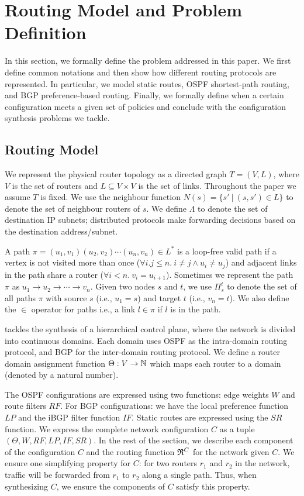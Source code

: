 \section{Routing Model and Problem Definition}
In this section, we formally define the problem addressed in this
paper.  We first define common notations and then show how different
routing protocols are represented.  In particular, we model static
routes, OSPF shortest-path routing, and BGP preference-based routing.
Finally, we formally define when a certain configuration meets a given
set of policies and conclude with the configuration synthesis problems
we tackle.

\subsection{Routing Model}

We represent the physical router topology as a directed graph $T=(V, L)$,
where $V$ is the set of routers and $L\subseteq V\times V$ is the set of links. 
Throughout the paper we assume $T$ is fixed.
We use the neighbour function $N(s) = \{s'\ | \ (s,s') \in L \}$ to denote 
the set of neighbour routers of $s$. 
We define $\Lambda$ to denote the set of destination IP subnets;
distributed protocols make forwarding decisions based on the 
destination address/subnet.

A path $\pi = (u_1,v_1) (u_2, v_2) \cdots (u_n, v_n) \in L^*$ is a loop-free valid path if
a  vertex is not visited more than once ($\forall i.j \leq n. 
~i \not= j \wedge u_i \not= u_j$) and adjacent links in the
path share a router ($\forall i < n. ~v_i = u_{i+1}$).
Sometimes we represent the path $\pi$ as $u_1\rightarrow u_2 \rightarrow  \cdots \rightarrow v_n$.
Given two nodes $s$ and $t$, we use $\Pi_s^t$ to denote the set of all paths
$\pi$ with source $s$ (i.e., $u_1=s$) and target $t$ (i.e., $v_n=t$). 
We also define the $\in$ operator for paths i.e., a link $l \in
\pi$ if $l$ is in the path. 

\name tackles the synthesis of a hierarchical control plane, 
where the network is divided into continuous domains. 
Each domain uses OSPF as the intra-domain routing protocol, 
and BGP for the inter-domain routing protocol. 
We define a router domain assignment function
$\Theta: V \rightarrow \mathbb{N}$ which maps each router to a domain 
(denoted by a natural number).

The OSPF configurations are expressed 
using two functions: edge weights $W$ and
 route filters $RF$. For BGP configurations: 
we have the local preference function $LP$ 
and the iBGP filter function $IF$. Static 
routes are expressed using the $SR$ function.
We express the complete network configuration $C$
as a tuple $(\Theta,W,RF,LP,IF,SR)$.  In the 
rest of the section, we describe each component 
of the configuration $C$ and the routing function 
$\mathfrak{R}^C$ for the network given $C$. We ensure one  
simplifying property for $C$: for two 
routers $r_1$ and $r_2$ in the network,
traffic will be forwarded from $r_1$ to $r_2$ 
along a single path. 
Thus, when synthesizing $C$, we ensure the components
of $C$ satisfy this property.



